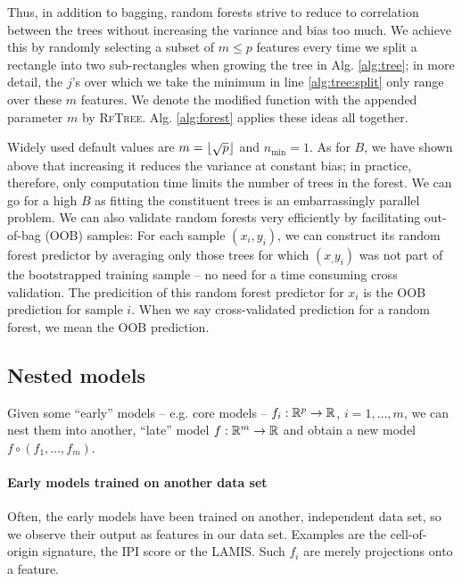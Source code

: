 Thus, in addition to bagging, random forests strive to reduce to correlation between the trees 
without increasing the variance and bias too much. We achieve this by randomly selecting a subset
of $m \leq p$ features every time we split a rectangle into two sub-rectangles when growing the 
tree in Alg. \ref{alg:tree}; in 
more detail, the $j$'s over which we take the minimum in line \ref{alg:tree:split} only range over 
these $m$ features. We denote the modified function with the appended parameter $m$ by 
\textsc{RfTree}. Alg. \ref{alg:forest} applies these ideas all together.



Widely used default values are $m = \lfloor\sqrt{p}\rfloor$ and $n_\text{min} = 1$. As for $B$, we have 
shown above that increasing it reduces the variance at constant bias; in practice, therefore, only 
computation time limits the number of trees in the forest. We can go for a high $B$ as fitting the 
constituent trees is an embarrassingly parallel problem. We can 
also validate random forests very efficiently by facilitating out-of-bag (OOB) samples: For each sample 
$(x_i, y_i)$, we can construct its random forest predictor by averaging only those trees for which 
$(x_, y_i)$ was not part of the bootstrapped training sample -- no need for a time consuming 
cross validation. The predicition of this random forest predictor for $x_i$ is the OOB prediction 
for sample $i$. When we say cross-validated prediction for a random forest, we mean the OOB
prediction.

\subsection{Nested models}\label{subsec:nested-models}

Given some ``early'' models -- e.g. core models -- $f_i: \mathbb{R}^p \to \mathbb{R}$, $i = 1, \ldots, m$, we can 
nest them into another, ``late'' model $f: \mathbb{R}^m \to \mathbb{R}$ and obtain a new model $f \circ 
(f_1, \ldots, f_m)$. 

\paragraph{Early models trained on another data set}
Often, the early models have been trained on another, independent data set, so we observe their 
output as features in our data set. Examples are the cell-of-origin signature, the IPI score or the 
LAMIS. Such $f_i$ are merely projections onto a feature.


